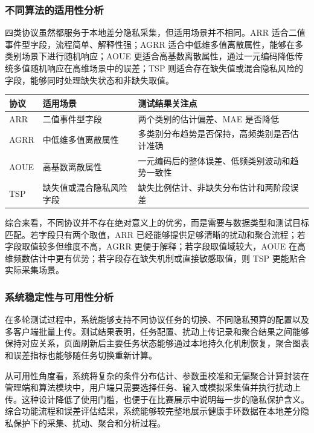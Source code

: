 \documentclass{cumcmthesis}
\numberwithin{equation}{section}
\numberwithin{figure}{section}
\numberwithin{table}{section}
\begin{document}
\subsubsection{不同算法的适用性分析}

四类协议虽然都服务于本地差分隐私采集，但适用场景并不相同。ARR 适合二值事件型字段，流程简单、解释性强；AGRR 适合中低维多值离散属性，能够在多类别场景下进行随机响应；AOUE 更适合高基数离散属性，通过一元编码降低传统多值随机响应在高维场景中的误差；TSP 则适合存在缺失值或混合隐私风险的字段，能够同时处理缺失状态和非缺失取值。

\begin{table}[htbp]
\centering
\small
\begin{tabularx}{\textwidth}{|>{\raggedright\arraybackslash}X|>{\raggedright\arraybackslash}X|>{\raggedright\arraybackslash}X|}
\hline
协议 & 适用场景 & 测试结果关注点 \\ \hline
ARR & 二值事件型字段 & 两个类别的估计偏差、MAE 是否降低 \\ \hline
AGRR & 中低维多值离散属性 & 多类别分布趋势是否保持，高频类别是否估计准确 \\ \hline
AOUE & 高基数离散属性 & 一元编码后的整体误差、低频类别波动和趋势一致性 \\ \hline
TSP & 缺失值或混合隐私风险字段 & 缺失比例估计、非缺失分布估计和两阶段误差 \\ \hline
\end{tabularx}
\end{table}

综合来看，不同协议并不存在绝对意义上的优劣，而是需要与数据类型和测试目标匹配。若字段只有两个取值，ARR 已经能够提供足够清晰的扰动和聚合流程；若字段取值较多但维度不高，AGRR 更便于解释；若字段取值域较大，AOUE 在高维频数估计中更有优势；若字段存在缺失机制或直接敏感取值，则 TSP 更能贴合实际采集场景。

\subsubsection{系统稳定性与可用性分析}

在多轮测试过程中，系统能够支持不同协议任务的切换、不同隐私预算的配置以及多客户端批量上传。测试结果表明，任务配置、扰动上传记录和聚合结果之间能够保持对应关系，页面刷新后主要任务状态能够通过本地持久化机制恢复，聚合图表和误差指标也能够随任务切换重新计算。

从可用性角度看，系统将复杂的条件分布估计、参数重校准和无偏聚合计算封装在管理端和算法模块中，用户端只需要选择任务、输入或模拟采集值并执行扰动上传。这种设计降低了使用门槛，也便于在比赛展示中说明每一步的隐私保护含义。综合功能流程和误差评估结果，系统能够较完整地展示健康手环数据在本地差分隐私保护下的采集、扰动、聚合和分析过程。
\end{document}
